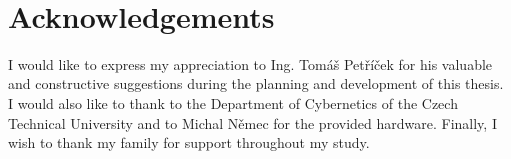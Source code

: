 ~\vfill{}

\section*{Acknowledgements}

I would like to express my appreciation to Ing. Tomáš Petříček for his valuable and constructive suggestions during the planning and development of this thesis. I would also like to thank to the Department of Cybernetics of the Czech Technical University and to Michal Němec for the provided hardware. Finally, I wish to thank my family for support throughout my study.

\vspace{2.5cm}

\newpage{}
